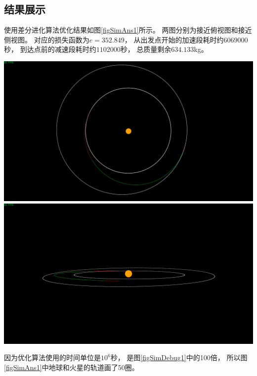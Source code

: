 \subsection{结果展示}
使用差分进化算法优化结果如图\ref{figSimAns1}所示。
两图分别为接近俯视图和接近侧视图。
对应的损失函数为$e=352.849$，
从出发点开始的加速段耗时约$6069000$秒，
到达点前的减速段耗时约$1102000$秒，
总质量剩余$634.133$kg。
\begin{center}
	\includegraphics[scale=0.2]{simans1.png}  \\
	\includegraphics[scale=0.2]{simans2.png}  \\
	\label{figSimAns1}
\end{center}
因为优化算法使用的时间单位是$10^6$秒，
是图\ref{figSimDebug1}中的100倍，
所以图\ref{figSimAns1}中地球和火星的轨道画了50圈。

